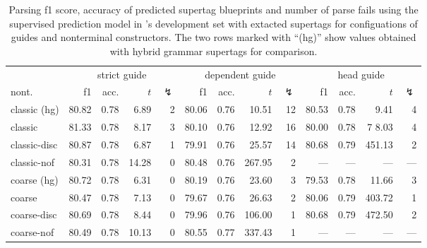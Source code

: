\documentclass[../../document.tex]{subfiles}
\begin{document}
    \begin{table}
        \caption{\label{tbl:gridsearch:dcp:2}
        Parsing f1 score, accuracy of predicted supertag blueprints and number of parse fails using the supervised prediction model in \negra{}'s development set with extacted  supertags for configuations of guides and nonterminal constructors. The two rows marked with ``(hg)'' show values obtained with hybrid grammar supertags for comparison.
        }
        \centering
        \setlength{\tabcolsep}{5pt}
        \vspace{.2cm}
        \begin{tabular}{l|rrrr|rrrr|rrrr}
            \toprule
                    & \multicolumn{4}{c|}{strict guide} &  \multicolumn{4}{c|}{dependent guide} &  \multicolumn{4}{c}{head guide} \\
nont.            & f1 & acc. & $t$ & $\lightning$ & f1 & acc. & $t$ & $\lightning$ & f1 & acc. & $t$ & $\lightning$ \\ \hline
\rowcolor{black!10}
classic (hg) & 80.82 & 0.78 &  6.89 & 2 & 80.06 & 0.76 &  10.51 & 12 & 80.53 & 0.78 &   9.41 & 4 \\\hline
classic      & 81.33 & 0.78 &  8.17 & 3 & 80.10 & 0.76 &  12.92 & 16 & 80.00 & 0.78 & 7 8.03 & 4 \\
classic-disc & 80.87 & 0.78 &  6.87 & 1 & 79.91 & 0.76 &  25.57 & 14 & 80.68 & 0.79 & 451.13 & 2 \\
classic-nof  & 80.31 & 0.78 & 14.28 & 0 & 80.48 & 0.76 & 267.95 &  2 &   --- &  --- &    --- & --- \\ \hline\rowcolor{black!10}
coarse (hg)  & 80.72 & 0.78 &  6.31 & 0 & 80.19 & 0.76 &  23.60 &  3 & 79.53 & 0.78 &  11.66 & 3 \\\hline
coarse       & 80.47 & 0.78 &  7.13 & 0 & 79.67 & 0.76 &  26.63 &  2 & 80.06 & 0.79 & 403.72 & 1 \\
coarse-disc  & 80.69 & 0.78 &  8.44 & 0 & 79.96 & 0.76 & 106.00 &  1 & 80.68 & 0.79 & 472.50 & 2 \\
coarse-nof   & 80.49 & 0.78 & 10.13 & 0 & 80.55 & 0.77 & 337.43 &  1 &   --- &  --- &    --- & --- \\
\bottomrule
        \end{tabular}
    \end{table}
\end{document}
